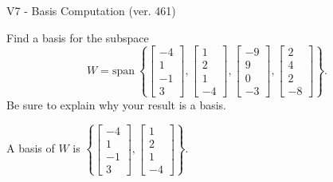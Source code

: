 \begin{exercise}
  \begin{exerciseTitle}V7 - Basis Computation (ver. 461)\end{exerciseTitle}
  \begin{exerciseStatement}
    Find a basis for the subspace 
\[W=\mathrm{span}\ \left\{\left[\begin{array}{r}
-4 \\
1 \\
-1 \\
3
\end{array}\right] , \left[\begin{array}{r}
1 \\
2 \\
1 \\
-4
\end{array}\right] , \left[\begin{array}{r}
-9 \\
9 \\
0 \\
-3
\end{array}\right] , \left[\begin{array}{r}
2 \\
4 \\
2 \\
-8
\end{array}\right]\right\}.\]
 Be sure to explain why your result is a basis.


  \end{exerciseStatement}
  \begin{exerciseAnswer}
   A basis of \(W\) is  \(\left\{\left[\begin{array}{r}
-4 \\
1 \\
-1 \\
3
\end{array}\right] , \left[\begin{array}{r}
1 \\
2 \\
1 \\
-4
\end{array}\right]\right\}\).
  


  \end{exerciseAnswer}
\end{exercise}